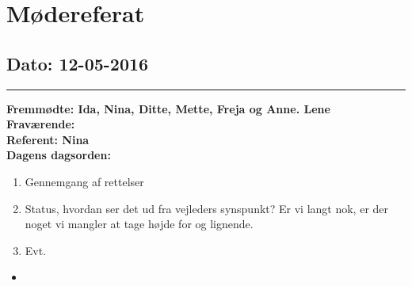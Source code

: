 \chapter{Mødereferat}

\section{Dato: 12-05-2016}
\hrule
\textbf{Fremmødte: Ida, Nina, Ditte, Mette, Freja og Anne. Lene} \\
\textbf{Fraværende:} \\
\textbf{Referent: Nina } \\
\textbf{Dagens dagsorden: }
\begin{enumerate}
\item Gennemgang af rettelser
\item Status, hvordan ser det ud fra vejleders synspunkt? Er vi langt nok, er der noget vi mangler at tage højde for og lignende.
\item Evt.
\end{enumerate}

\begin{itemize}
\item 
\end{itemize}
\newpage


